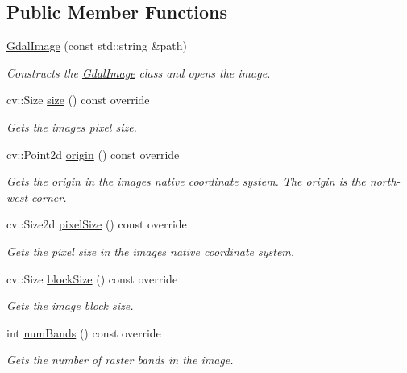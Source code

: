 \subsection*{Public Member Functions}
\begin{DoxyCompactItemize}
\item 
\hyperlink{group___imagery_module_ga2c05530c01c9cc6bf0d0f332b74cecc3}{Gdal\+Image} (const std\+::string \&path)
\begin{DoxyCompactList}\small\item\em Constructs the \hyperlink{classdg_1_1deepcore_1_1imagery_1_1_gdal_image}{Gdal\+Image} class and opens the image. \end{DoxyCompactList}\item 
cv\+::\+Size \hyperlink{classdg_1_1deepcore_1_1imagery_1_1_gdal_image_abb3fdf6d72f690606ee00a6f1db93889}{size} () const override
\begin{DoxyCompactList}\small\item\em Gets the image\textquotesingle{}s pixel size. \end{DoxyCompactList}\item 
cv\+::\+Point2d \hyperlink{classdg_1_1deepcore_1_1imagery_1_1_gdal_image_a5a9fdea0bf1473c6c54a116a3b3fcd58}{origin} () const override
\begin{DoxyCompactList}\small\item\em Gets the origin in the image\textquotesingle{}s native coordinate system. The origin is the north-\/west corner. \end{DoxyCompactList}\item 
cv\+::\+Size2d \hyperlink{classdg_1_1deepcore_1_1imagery_1_1_gdal_image_a703aceb4c6ab2e7b1948e0df6b44d965}{pixel\+Size} () const override
\begin{DoxyCompactList}\small\item\em Gets the pixel size in the image\textquotesingle{}s native coordinate system. \end{DoxyCompactList}\item 
cv\+::\+Size \hyperlink{classdg_1_1deepcore_1_1imagery_1_1_gdal_image_ab9f14e75cccbffc7f43081f4dc171b53}{block\+Size} () const override
\begin{DoxyCompactList}\small\item\em Gets the image block size. \end{DoxyCompactList}\item 
int \hyperlink{classdg_1_1deepcore_1_1imagery_1_1_gdal_image_a12f9039f7445e931359b351045676051}{num\+Bands} () const override
\begin{DoxyCompactList}\small\item\em Gets the number of raster bands in the image. \end{DoxyCompactList}\item 

\end{DoxyCompactItemize}
